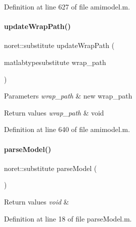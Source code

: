 Definition at line 627 of file amimodel.\+m.

\mbox{\label{classamimodel_a802e66e0a311bd894de30058b7bf028a}} 
\paragraph{\texorpdfstring{update\+Wrap\+Path()}{updateWrapPath()}}
{\footnotesize\ttfamily noret\+::substitute update\+Wrap\+Path (\begin{DoxyParamCaption}\item[{matlabtypesubstitute}]{wrap\+\_\+path }\end{DoxyParamCaption})}


\begin{DoxyParams}{Parameters}
{\em wrap\+\_\+path} & new wrap\+\_\+path\\
\hline
\end{DoxyParams}

\begin{DoxyRetVals}{Return values}
{\em wrap\+\_\+path} & void \\
\hline
\end{DoxyRetVals}


Definition at line 640 of file amimodel.\+m.

\mbox{\label{classamimodel_ae4172c2a8fac8b7c434f03274fcac6ac}} 
\paragraph{\texorpdfstring{parse\+Model()}{parseModel()}}
{\footnotesize\ttfamily noret\+::substitute parse\+Model (\begin{DoxyParamCaption}{ }\end{DoxyParamCaption})}


\begin{DoxyRetVals}{Return values}
{\em void} & \\
\hline
\end{DoxyRetVals}


Definition at line 18 of file parse\+Model.\+m.

